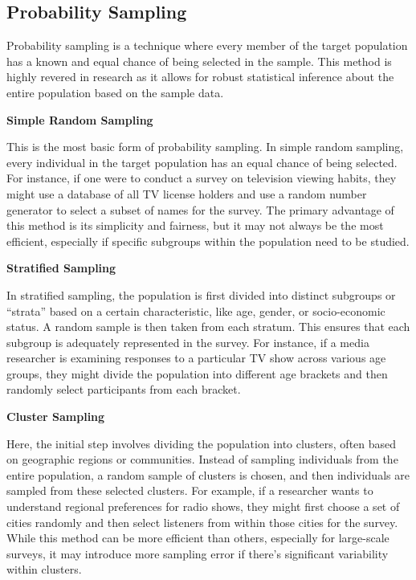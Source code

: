 \documentclass[
  b5paper]{book}
\begin{document}
\hypertarget{probability-sampling}{%
\subsection*{Probability Sampling}\label{probability-sampling}}

Probability sampling is a technique where every member of the target population has a known and equal chance of being selected in the sample. This method is highly revered in research as it allows for robust statistical inference about the entire population based on the sample data.

\textbf{Simple Random Sampling}

This is the most basic form of probability sampling. In simple random sampling, every individual in the target population has an equal chance of being selected. For instance, if one were to conduct a survey on television viewing habits, they might use a database of all TV license holders and use a random number generator to select a subset of names for the survey. The primary advantage of this method is its simplicity and fairness, but it may not always be the most efficient, especially if specific subgroups within the population need to be studied.

\textbf{Stratified Sampling}

In stratified sampling, the population is first divided into distinct subgroups or ``strata'' based on a certain characteristic, like age, gender, or socio-economic status. A random sample is then taken from each stratum. This ensures that each subgroup is adequately represented in the survey. For instance, if a media researcher is examining responses to a particular TV show across various age groups, they might divide the population into different age brackets and then randomly select participants from each bracket.

\textbf{Cluster Sampling}

Here, the initial step involves dividing the population into clusters, often based on geographic regions or communities. Instead of sampling individuals from the entire population, a random sample of clusters is chosen, and then individuals are sampled from these selected clusters. For example, if a researcher wants to understand regional preferences for radio shows, they might first choose a set of cities randomly and then select listeners from within those cities for the survey. While this method can be more efficient than others, especially for large-scale surveys, it may introduce more sampling error if there's significant variability within clusters.
\end{document}

